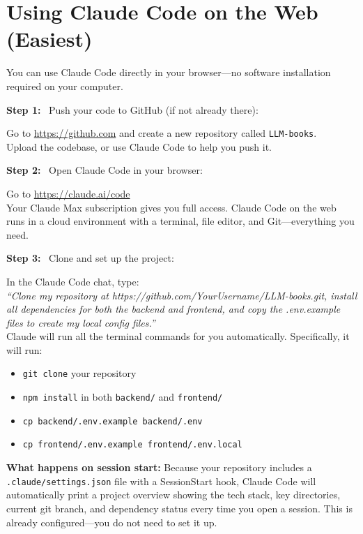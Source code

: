 \documentclass[12pt, letterpaper, oneside]{book}
\newcommand{\step}[1]{\noindent\textbf{\textcolor{primary}{Step #1:}}~}
\begin{document}
\section{Using Claude Code on the Web (Easiest)}

You can use Claude Code directly in your browser---no software installation required on your computer.

\step{1} Push your code to GitHub (if not already there):
\begin{actionbox}
Go to \url{https://github.com} and create a new repository called \texttt{LLM-books}.\\
Upload the codebase, or use Claude Code to help you push it.
\end{actionbox}

\step{2} Open Claude Code in your browser:
\begin{actionbox}
Go to \url{https://claude.ai/code}\\[4pt]
Your Claude Max subscription gives you full access. Claude Code on the web runs in a cloud environment with a terminal, file editor, and Git---everything you need.
\end{actionbox}

\step{3} Clone and set up the project:
\begin{actionbox}
In the Claude Code chat, type:\\[4pt]
\textit{``Clone my repository at https://github.com/YourUsername/LLM-books.git, install all dependencies for both the backend and frontend, and copy the .env.example files to create my local config files.''}\\[4pt]
Claude will run all the terminal commands for you automatically. Specifically, it will run:
\begin{itemize}[leftmargin=1.5em, itemsep=2pt]
  \item \texttt{git clone} your repository
  \item \texttt{npm install} in both \texttt{backend/} and \texttt{frontend/}
  \item \texttt{cp backend/.env.example backend/.env}
  \item \texttt{cp frontend/.env.example frontend/.env.local}
\end{itemize}
\end{actionbox}

\begin{infobox}
\textbf{What happens on session start:} Because your repository includes a \texttt{.claude/settings.json} file with a SessionStart hook, Claude Code will automatically print a project overview showing the tech stack, key directories, current git branch, and dependency status every time you open a session. This is already configured---you do not need to set it up.
\end{infobox}
\end{document}
